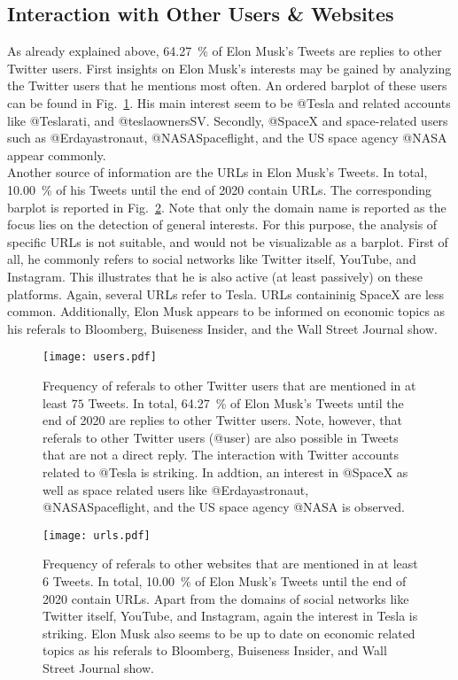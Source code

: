 \subsection{Interaction with Other Users \& Websites}

As already explained above, \SI{64.27}{\percent} of Elon Musk's Tweets are replies to other Twitter users. First insights on Elon Musk's interests may be gained by analyzing the Twitter users that he mentions  most often. An ordered barplot of these users can be found in Fig.~\ref{fig:users}. His main interest seem to be @Tesla and related accounts like @Teslarati, and @teslaownersSV. Secondly, @SpaceX and space-related users such as @Erdayastronaut, @NASASpaceflight, and the US space agency @NASA appear commonly.\\

Another source of information are the URLs in Elon Musk's Tweets. In total, \SI{10.00}{\percent} of his Tweets until the end of 2020 contain URLs. The corresponding barplot is reported in Fig.~\ref{fig:urls}. Note that only the domain name is reported as the focus lies on the detection of general interests. For this purpose, the analysis of specific URLs is not suitable, and would not be visualizable as a barplot. First of all, he commonly refers to social networks like Twitter itself, YouTube, and Instagram. This illustrates that he is also active (at least passively) on these platforms. Again, several URLs refer to Tesla. URLs containinig SpaceX are less common. Additionally, Elon Musk appears to be informed on economic topics as his referals to Bloomberg, Buiseness Insider, and the Wall Street Journal show.

\begin{figure}[h!]
\centering
\texttt{[image: users.pdf]}
\caption{Frequency of referals to other Twitter users that are mentioned in at least $75$ Tweets. In total, \SI{64.27}{\percent} of Elon Musk's Tweets until the end of 2020 are replies to other Twitter users. Note, however, that referals to other Twitter users (@user) are also possible in Tweets that are not a direct reply. The interaction with Twitter accounts related to @Tesla is striking. In addtion, an interest in @SpaceX as well as space related users like @Erdayastronaut, @NASASpaceflight, and the US space agency @NASA is observed.}
\label{fig:users}
\end{figure}

\clearpage

\begin{figure}[h!]
\centering
\texttt{[image: urls.pdf]}
\caption{Frequency of referals to other websites that are mentioned in at least $6$ Tweets. In total, \SI{10.00}{\percent} of Elon Musk's Tweets until the end of 2020 contain URLs. Apart from the domains of social networks like Twitter itself, YouTube, and Instagram, again the interest in Tesla is striking. Elon Musk also seems to be up to date on economic related topics as his referals to Bloomberg, Buiseness Insider, and Wall Street Journal show.}
\label{fig:urls}
\end{figure}


